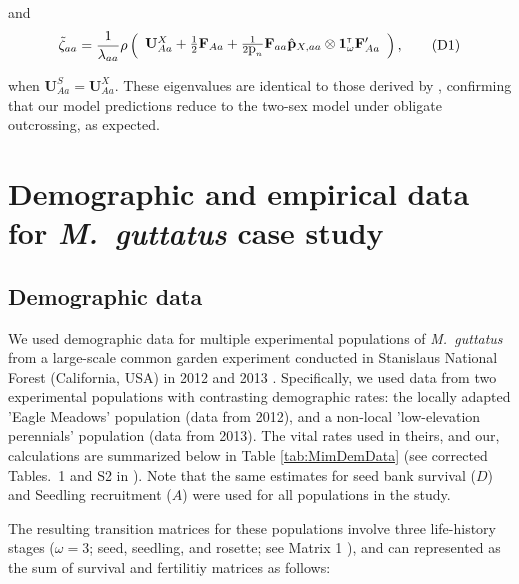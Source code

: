 \documentclass[11pt]{article}
\newcommand\numberthis{\addtocounter{equation}{1}\tag{\theequation}}
\def\mbf#1{\mathbf{#1}}
\newcommand{\tr}{{\mbox{\tiny \sf T}}}
\begin{document}
\noindent and 
\begin{align*} \label{eq:eigaaTwoSex}
	\tilde{\zeta}_{aa} = 
		\frac{1}{\lambda_{aa}}\rho\left(\begin{array}{c}
\mathbf{U}^X_{Aa} + \frac{1}{2} \mbf{F}_{Aa} +\frac{1}{2\mbox{p}_{n}} \mbf{F}_{aa} \hat{\mbf{p}}_{X,aa} \otimes \mathbf{1}^\tr_{\omega} \mathbf{F}_{Aa}^\prime
			\end{array} \right), \numberthis
\end{align*}

\noindent when $\mathbf{U}^S_{Aa}=\mathbf{U}^X_{Aa}$. These eigenvalues are identical to those derived by \citet{deVriesCaswell2019a}, confirming that our model predictions reduce to the two-sex model under obligate outcrossing, as expected.




\section{Demographic and empirical data for {\itshape M.~guttatus} case study}\label{App:Mimulus}
\renewcommand{\theequation}{D\arabic{equation}}
\renewcommand{\thetable}{D\arabic{table}}
\setcounter{equation}{0}  %
\setcounter{table}{0}  %


\subsection*{Demographic data}

We used demographic data for multiple experimental populations of {\itshape M.~guttatus} from a large-scale common garden experiment conducted in Stanislaus National Forest (California, USA) in 2012 and 2013 \citep{PetersonEtAl2016}. Specifically, we used data from two experimental populations with contrasting demographic rates: the locally adapted 'Eagle Meadows' population (data from 2012), and a non-local 'low-elevation perennials' population (data from 2013). The vital rates used in theirs, and our, calculations are summarized below in Table \ref{tab:MimDemData} (see corrected Tables.~1 and S2 in \citet{PetersonEtAl2016, PetersonEtAl2017}). Note that the same estimates for seed bank survival ($D$) and Seedling recruitment ($A$) were used for all populations in the study. 

The resulting transition matrices for these populations involve three life-history stages ($\omega = 3$; seed, seedling, and rosette; see Matrix 1 \citealt{PetersonEtAl2016}), and can represented as the sum of survival and fertilitiy matrices as follows:
\end{document}
